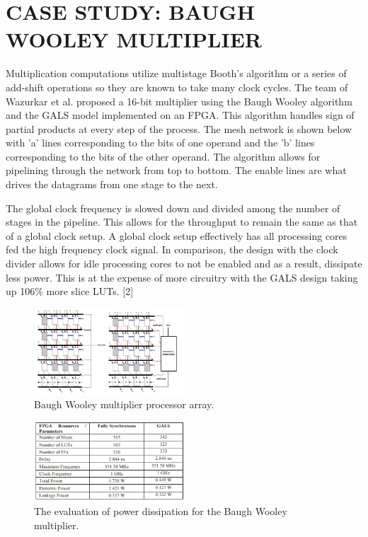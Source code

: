 \documentclass[letterpaper, 10 pt, conference]{ieeeconf}
\begin{document}
\section{CASE STUDY: BAUGH WOOLEY MULTIPLIER}

Multiplication computations utilize multistage Booth's algorithm or a series of add-shift operations so they are known to take many clock cycles.  The team of Wazurkar et al. proposed a 16-bit multiplier using the Baugh Wooley algorithm and the GALS model implemented on an FPGA.  This algorithm handles sign of partial products at every step of the process.  The mesh network is shown below with 'a' lines corresponding to the bits of one operand and the 'b' lines corresponding to the bits of the other operand.  The algorithm allows for pipelining through the network from top to bottom.  The enable lines are what drives the datagrams from one stage to the next.

The global clock frequency is slowed down and divided among the number of stages in the pipeline.  This allows for the throughput to remain the same as that of a global clock setup.  A global clock setup effectively has all processing cores fed the high frequency clock signal.  In comparison, the design with the clock divider allows for idle processing cores to not be enabled and as a result, dissipate less power.  This is at the expense of more circuitry with the GALS design taking up 106\% more slice LUTs. [2]

\begin{figure}[!ht] %
	\centering
	\includegraphics [width=0.5\textwidth] {Multiply_Network.png} 
    \caption{Baugh Wooley multiplier processor array.}
\end{figure}

\begin{figure}[!ht] %
	\centering
	\includegraphics [width=0.5\textwidth] {Multiply_Results.PNG} 
    \caption{The evaluation of power dissipation for the Baugh Wooley multiplier.}
\end{figure}
\end{document}
